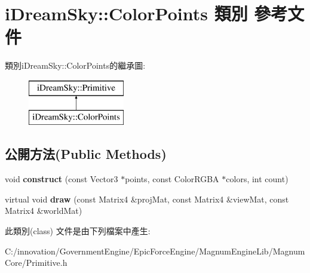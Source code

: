 \hypertarget{classi_dream_sky_1_1_color_points}{}\section{i\+Dream\+Sky\+:\+:Color\+Points 類別 參考文件}
\label{classi_dream_sky_1_1_color_points}
類別i\+Dream\+Sky\+:\+:Color\+Points的繼承圖\+:\begin{figure}[H]
\begin{center}
\leavevmode
\includegraphics[height=2.000000cm]{classi_dream_sky_1_1_color_points}
\end{center}
\end{figure}
\subsection*{公開方法(Public Methods)}
\begin{DoxyCompactItemize}
\item 
void {\bfseries construct} (const Vector3 $\ast$points, const Color\+R\+G\+BA $\ast$colors, int count)\hypertarget{classi_dream_sky_1_1_color_points_a2b54f7fb0d8fd64f7622ad13b4baa169}{}\label{classi_dream_sky_1_1_color_points_a2b54f7fb0d8fd64f7622ad13b4baa169}

\item 
virtual void {\bfseries draw} (const Matrix4 \&proj\+Mat, const Matrix4 \&view\+Mat, const Matrix4 \&world\+Mat)\hypertarget{classi_dream_sky_1_1_color_points_a1223e3864f09dc7802152e46e62cb367}{}\label{classi_dream_sky_1_1_color_points_a1223e3864f09dc7802152e46e62cb367}

\end{DoxyCompactItemize}


此類別(class) 文件是由下列檔案中產生\+:\begin{DoxyCompactItemize}
\item 
C\+:/innovation/\+Government\+Engine/\+Epic\+Force\+Engine/\+Magnum\+Engine\+Lib/\+Magnum\+Core/Primitive.\+h\end{DoxyCompactItemize}
